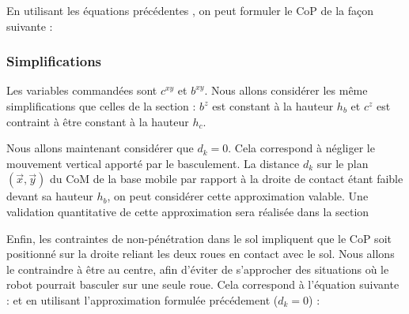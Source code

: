				En utilisant les équations précédentes , on peut formuler le CoP de la façon suivante :	
				
			\subsubsection{Simplifications}
				
				Les variables commandées sont $c^{xy}$ et $b^{xy}$. Nous allons considérer les même simplifications que celles de la section  :
				$b^z$ est constant à la hauteur $h_b$ et $c^z$ est contraint à être constant à la hauteur $h_c$.
				
				Nous allons maintenant considérer que $d_k=0$. Cela correspond à négliger le mouvement vertical apporté par le basculement. 
				La distance $d_k$ sur le plan $(\vec{x},\vec{y})$ du CoM de la base mobile par rapport à la droite de contact étant faible devant sa hauteur $h_b$, on peut considérer cette approximation valable. 
				Une validation quantitative de cette approximation sera réalisée dans la section 
				
				Enfin, les contraintes de non-pénétration dans le sol impliquent que le CoP soit positionné sur la droite reliant les deux roues en contact avec le sol.
				Nous allons le contraindre à être au centre, afin d'éviter de s'approcher des situations où le robot pourrait basculer sur une seule roue.
				Cela correspond à l'équation suivante :
				et en utilisant l'approximation formulée précédement ($d_k=0$) :
				

